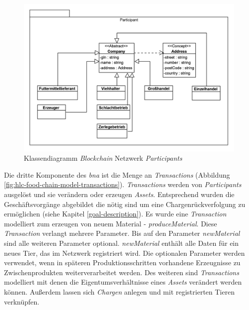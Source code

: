 \begin{figure}[H]
	\centering
	\includegraphics[width=1\linewidth]{pictures/hlc-food-chain-model-participants}
	\caption[Klassendiagramm \textit{Blockchain} Netzwerk \textit{Participants}]{Klassendiagramm \textit{Blockchain} Netzwerk \textit{Participants}}
	\label{fig:hlc-food-chain-model-participants}
\end{figure}

\noindent
Die dritte Komponente des \textit{\ac{bna}} ist die Menge an \textit{Transactions} (Abbildung \ref{fig:hlc-food-chain-model-transactions}). \textit{Transactions} werden von \textit{Participants} ausgelöst und sie verändern oder erzeugen \textit{Assets}. Entsprechend wurden die Geschäftsvorgänge abgebildet die nötig sind um eine Chargenrückverfolgung zu ermöglichen (siehe Kapitel \ref{goal-description}). Es wurde eine \textit{Transaction} modelliert zum erzeugen von neuem Material - \textit{produceMaterial}. Diese \textit{Transaction} verlangt mehrere Parameter. Bis auf den Parameter \textit{newMaterial} sind alle weiteren Parameter optional. \textit{newMaterial} enthält alle Daten für ein neues Tier, das im Netzwerk registriert wird. Die optionalen Parameter werden verwendet, wenn in späteren Produktionsschritten vorhandene Erzeugnisse zu Zwischenprodukten weiterverarbeitet werden. Des weiteren sind \textit{Transactions} modelliert mit denen die Eigentumsverhältnisse eines \textit{Assets} verändert werden können. Außerdem lassen sich \textit{Chargen} anlegen und mit registrierten Tieren verknüpfen. 


